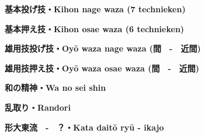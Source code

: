 \documentclass[a4paper, 12pt]{article}
\begin{document}
\newpage
\begin{landscape}
\thispagestyle{empty} %
\begin{center}
    \textbf{基本投げ技・Kihon nage waza (7 technieken)}
\end{center}
\label{kihonnagewaza}

\end{landscape}

\newpage
\thispagestyle{empty} %
\begin{landscape}
\begin{center}
    \textbf{基本押え技・Kihon osae waza (6 technieken)}
\end{center}
\label{kihonosaewaza}

\end{landscape}

\newpage
\begin{center}
    \textbf{雄用技投げ技・Oy\={o} waza nage waza (間　-　近間)}
\end{center}


\begin{center}
    \textbf{雄用技押え技・Oy\={o} waza osae waza (間　-　近間)}
\end{center}


\begin{center}
    \textbf{和の精神・Wa no sei shin}
\end{center}


\begin{center}
    \textbf{乱取り・Randori}
\end{center}


\begin{center}
    \textbf{形大東流　-　？・Kata dait\={o} ry\={u} - ikajo}
\end{center}


\newpage
\end{document}
